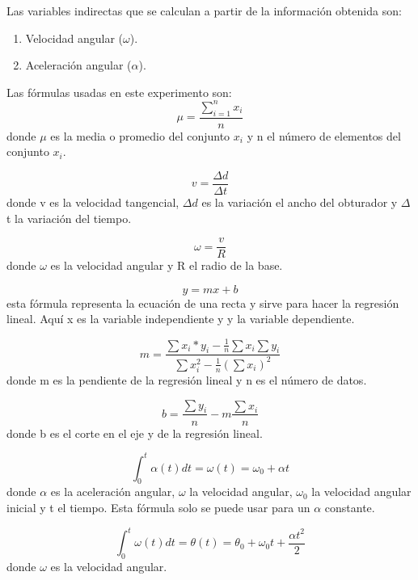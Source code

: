 \documentclass[a4paper]{article}
\begin{document}
Las variables indirectas que se calculan a partir de la información obtenida son:
\begin{enumerate}
  \item Velocidad angular ($\omega$).
  \item Aceleración angular ($\alpha$).
\end{enumerate}

Las fórmulas usadas en este experimento son:
\begin{equation}
    \mu= \frac{\displaystyle\sum_{i=1}^{n} x_i}{n}
\end{equation}
donde $\mu$ es la media o promedio del conjunto $x_i$ y n el número de elementos del conjunto $x_i$.

\begin{equation}
   v=\frac{\Delta d}{\Delta t}
\end{equation}
donde v es la velocidad tangencial, $\Delta d$  es la variación el ancho del obturador y $\Delta$t la variación del tiempo.

\begin{equation}
    \omega=\frac{v}{R}
\end{equation}
donde $\omega$ es la velocidad angular y R el radio de la base.

\begin{equation}
    y=mx+b
\end{equation}
esta fórmula representa la ecuación de una recta y sirve para hacer la regresión lineal. Aquí x es la variable independiente y y la variable dependiente. 

\begin{equation}
   m=\frac{\sum x_i*y_i-\frac{1}{n}\sum x_i \sum y_i}{\sum x_i^2-\frac{1}{n}(\sum x_i)^2} 
\end{equation}
donde m es la pendiente de la regresión lineal y n es el número de datos.

\begin{equation}
    b=\frac{\sum y_i}{n}-m\frac{\sum x_i}{n}
\end{equation}
donde b es el corte en el eje y de la regresión lineal.

\begin{equation}
    \int_{0}^{t} \alpha (t)dt= \omega(t)=\omega_0+\alpha t
\end{equation}
donde $\alpha$ es la aceleración angular, $\omega$ la velocidad angular, $\omega_0$ la velocidad angular inicial y t el tiempo. Esta fórmula solo se puede usar para un $\alpha$ constante. 

\begin{equation}
    \int_{0}^{t} \omega(t)dt= \theta (t) = \theta_0+\omega_0 t+\frac{\alpha t^2}{2}
\end{equation}
donde $\omega$ es la velocidad angular. 
\end{document}
